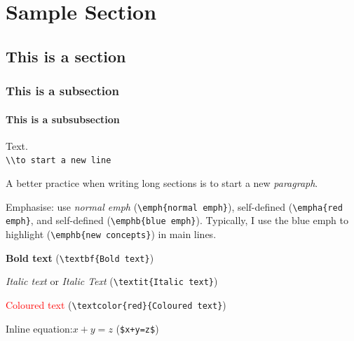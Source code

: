 \chapter*{Sample Section}

\section{This is a section}

    \subsection{This is a subsection}
        
        \subsubsection{This is a subsubsection}
            
            Text.\\ %
            \verb!\\to start a new line!
            
            A better practice when writing long sections is to start a new \emph{paragraph}.
            
            Emphasise: use \emph{normal emph} (\verb!\emph{normal emph}!), self-defined  (\verb|\empha{red emph}|, and self-defined  (\verb|\emphb{blue emph}|). Typically, I use the blue emph to highlight  (\verb|\emphb{new concepts}|) in main lines.
            
            \textbf{Bold text} (\verb|\textbf{Bold text}|)
            
            \textit{Italic text} or \emph{Italic Text} (\verb|\textit{Italic text}|)
            
            \textcolor{red}{Coloured text} (\verb|\textcolor{red}{Coloured text}|)
            
            Inline equation:$x+y=z$ (\verb!$x+y=z$!)
            
